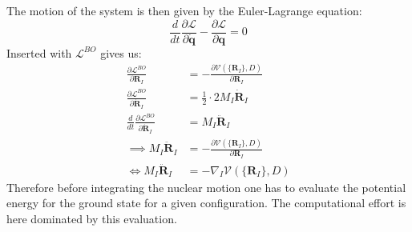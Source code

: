 \documentclass[12pt]{scrartcl}
\begin{document}
The motion of the system is then given by the Euler-Lagrange equation:
\begin{equation}
\frac{d}{dt}\frac{\partial \mathcal{L}}{\partial \dot{\mathbf{q}}} - \frac{\partial \mathcal{L}}{\partial \mathbf{q}} = 0
\label{euler-lagrange-eq}
\end{equation}
Inserted with $\mathcal{L}^{BO}$ gives us:
\begin{align*}
\frac{\partial \mathcal{L}^{BO}}{\partial \mathbf{R}_I} &= - \frac{\partial \mathcal{V}(\{\mathbf{R}_I\},D)}{\partial \mathbf{R}_I}\\
\frac{\partial \mathcal{L}^{BO}}{\partial \dot{\mathbf{R}}_I} &= \frac{1}{2}\cdot 2 M_I \dot{\mathbf{R}}_I\\
\frac{d}{dt} \frac{\partial \mathcal{L}^{BO}}{\partial \dot{\mathbf{R}}_I} &= M_I \ddot{\mathbf{R}}_I\\
\implies M_I \ddot{\mathbf{R}}_I &= - \frac{\partial \mathcal{V}(\{\mathbf{R}_I\},D)}{\partial \mathbf{R}_I}\\
\iff M_I \ddot{\mathbf{R}}_I &= - \nabla_I \mathcal{V}(\{\mathbf{R}_I\},D)
\end{align*}
Therefore before integrating the nuclear motion one has to evaluate the potential energy for the ground state for a given configuration. The computational effort is here dominated by this evaluation.
\end{document}
